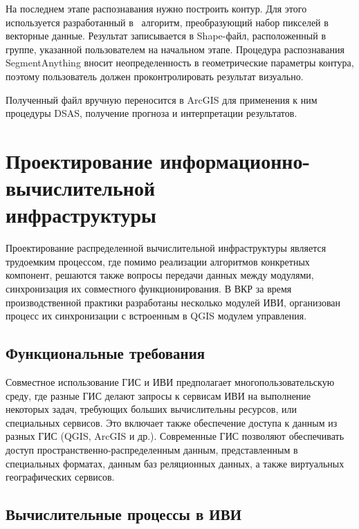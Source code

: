 \documentclass[732,fontsize=14pt,final]{studrep}
\begin{document}
На последнем этапе распознавания нужно построить контур. Для этого используется разработанный в~\cite{b3} алгоритм, преобразующий набор пикселей в векторные данные. Результат записывается в Shape-файл, расположенный в группе, указанной пользователем на начальном этапе. Процедура распознавания SegmentAnything вносит неопределенность в геометрические параметры контура, поэтому пользователь должен проконтролировать результат визуально.

Полученный файл вручную переносится в ArcGIS для применения к ним процедуры DSAS, получение прогноза и интерпретации результатов.

\section{Проектирование информационно-вычислительной\\инфраструктуры}

Проектирование распределенной вычислительной инфраструктуры является трудоемким процессом, где помимо реализации алгоритмов конкретных компонент, решаются также вопросы передачи данных между модулями, синхронизация их совместного функционирования. В ВКР за время производственной практики разработаны несколько модулей ИВИ, организован процесс их синхронизации с встроенным в QGIS модулем управления.

\subsection{Функциональные требования}

Совместное использование ГИС и ИВИ предполагает многопользовательскую среду, где разные ГИС делают запросы к сервисам ИВИ на выполнение некоторых задач, требующих больших вычислительны ресурсов, или специальных сервисов. Это включает также обеспечение доступа к данным из разных ГИС (QGIS, ArcGIS и др.). Современные ГИС позволяют обеспечивать доступ пространственно-распределенным данным, представленным в специальных форматах, данным баз реляционных данных, а также виртуальных географических сервисов.

\subsection{Вычислительные процессы в ИВИ}\label{sec:ivi}
\end{document}

